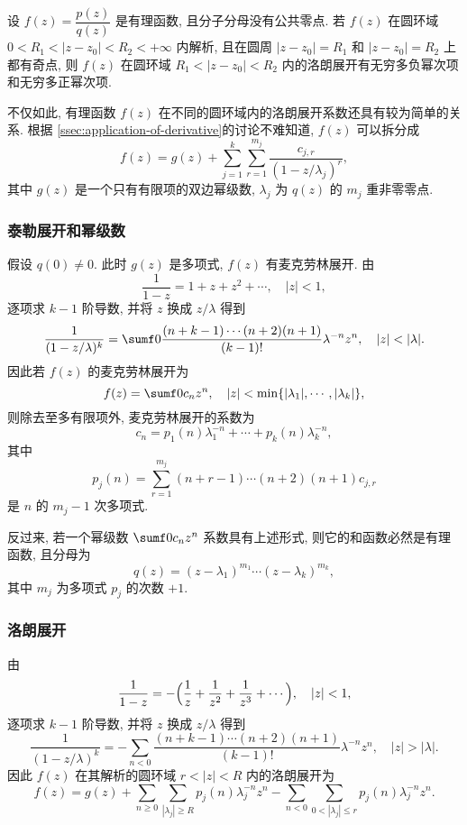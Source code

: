 \begin{example}
  设 $f(z)=\dfrac{p(z)}{q(z)}$ 是有理函数, 且分子分母没有公共零点.
  若 $f(z)$ 在圆环域 $0<R_1<|z-z_0|<R_2<+\infty$ 内解析, 且在圆周 $|z-z_0|=R_1$ 和 $|z-z_0|=R_2$ 上都有奇点, 则 $f(z)$ 在圆环域 $R_1<|z-z_0|<R_2$ 内的洛朗展开有无穷多负幂次项和无穷多正幂次项.
\end{example}

不仅如此, 有理函数 $f(z)$ 在不同的圆环域内的洛朗展开系数还具有较为简单的关系.
根据 \ref{ssec:application-of-derivative}的讨论不难知道, $f(z)$ 可以拆分成
\[
  f(z)=g(z)+\sum_{j=1}^k \sum_{r=1}^{m_j} \frac{c_{j,r}}{(1-z/\lambda_j)^r},
\]
其中 $g(z)$ 是一个只有有限项的双边幂级数, $\lambda_j$ 为 $q(z)$ 的 $m_j$ 重非零零点.


\subsubsection{泰勒展开和幂级数}

假设 $q(0)\neq 0$.
此时 $g(z)$ 是多项式, $f(z)$ 有麦克劳林展开.
由
\[
  \frac1{1-z}=1+z+z^2+\cdots,\quad |z|<1,
\]
逐项求 $k-1$ 阶导数, 并将 $z$ 换成 $z/\lambda$ 得到
\[
   \frac1{(1-z/\lambda)^k}
  =\sumf0 \frac{(n+k-1)\cdots(n+2)(n+1)}{(k-1)!}\lambda^{-n}z^n,\quad |z|<|\lambda|.
\]
因此若 $f(z)$ 的麦克劳林展开为
\[
  f(z)=\sumf0 c_n z^n,\quad |z|<\min\{|\lambda_1|,\cdots,|\lambda_k|\},
\]
则除去至多有限项外, 麦克劳林展开的系数为
\[
  c_n=p_1(n)\lambda_1^{-n}+\cdots+p_k(n)\lambda_k^{-n},
\]
其中
\[
  p_j(n)=\sum_{r=1}^{m_j} (n+r-1)\cdots(n+2)(n+1)c_{j,r}
\]
是 $n$ 的 $m_j-1$ 次多项式.

反过来, 若一个幂级数 $\sumf0 c_nz^n$ 系数具有上述形式, 则它的和函数必然是有理函数, 且分母为 
\[
  q(z)=(z-\lambda_1)^{m_1}\cdots (z-\lambda_k)^{m_k},
\]
其中 $m_j$ 为多项式 $p_j$ 的次数 $+1$.


\subsubsection{洛朗展开}

由
\[
  \frac1{1-z}=-\Bigl(\frac1z+\frac1{z^2}+\frac1{z^3}+\cdots\Bigr),\quad |z|<1,
\]
逐项求 $k-1$ 阶导数, 并将 $z$ 换成 $z/\lambda$ 得到
\[
    \frac1{(1-z/\lambda)^k}
   =-\sum_{n<0} \frac{(n+k-1)\cdots(n+2)(n+1)}{(k-1)!}\lambda^{-n}z^n,\quad |z|>|\lambda|.
\]
因此 $f(z)$ 在其解析的圆环域 $r<|z|<R$ 内的洛朗展开为
\[
  f(z)=g(z)+\sum_{n\ge 0} \sum_{|\lambda_j|\ge R} p_j(n)\lambda_j^{-n}z^n
  -\sum_{n<0} \sum_{0<|\lambda_j|\le r} p_j(n)\lambda_j^{-n}z^n.
\]


